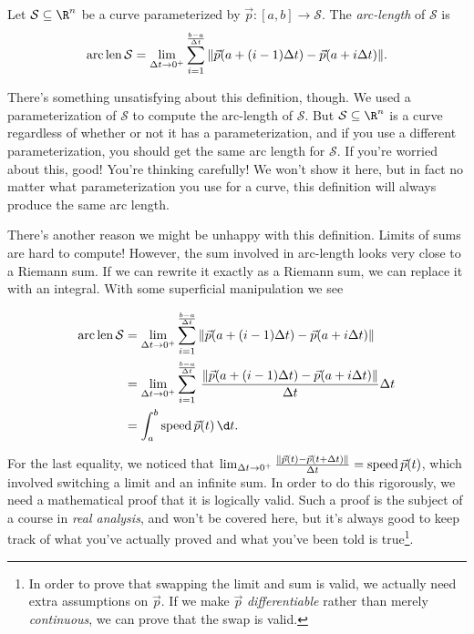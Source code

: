 \begin{definition}
	Let $\mathcal S\subseteq \R^n$ be a curve parameterized by $\vec p:[a,b]\to\mathcal S$. 
	The \emph{arc-length}
	of $\mathcal S$ is 
	\[
		\operatorname{arc\,len}\mathcal S = \lim_{\Delta t\to 0^+} \sum_{i=1}^{\frac{b-a}{\Delta t}} 
		\,\lVert\vec p(a+(i-1)\Delta t)-\vec p(a+i\Delta t)\rVert.
	\]
\end{definition}

There's something unsatisfying about this definition, though.  We used a parameterization
of $\mathcal S$ to compute the arc-length of $\mathcal S$.  But $\mathcal S\subseteq \R^n$ 
is a curve regardless of whether or not it has a parameterization, and if you use a different
parameterization, you should get the same arc length for $\mathcal S$.  If you're worried about
this, good!  You're thinking carefully!  We won't show it here, but in fact no matter what parameterization
you use for a curve, this definition will always produce the same arc length.

There's another reason we might be unhappy with this definition.  Limits of sums are
hard to compute!  However, the sum involved in arc-length looks very close to a Riemann sum.
If we can rewrite it exactly as a Riemann sum, we can replace it with an integral.  With some
superficial manipulation we see

\begin{align*}
	\Arclen\mathcal S 
	&= \lim_{\Delta t\to 0^+} \sum_{i=1}^{\frac{b-a}{\Delta t}} 
	\,\norm{\vec p(a+(i-1)\Delta t)-\vec p(a+i\Delta t)}\\
	&= \lim_{\Delta t\to 0^+} \sum_{i=1}^{\frac{b-a}{\Delta t}} 
	\,\frac{\norm{\vec p(a+(i-1)\Delta t)-\vec p(a+i\Delta t)}}{\Delta t}\Delta t\\
	&=\int_{a}^b \Speed \vec p(t)\,\d t.
\end{align*}

For the last equality, we noticed that 
$\lim_{\Delta t\to 0^+} \frac{\lVert\vec p(t)-\vec p(t+\Delta t)\rVert}{\Delta t}=\operatorname{speed} \vec p(t)$,
which involved switching a limit and an infinite sum.  In order to do this rigorously, we need
a mathematical proof that it is logically valid.  Such a proof is the subject of a course in
\emph{real analysis}, and won't be covered here, but it's always good to keep track of what
you've actually proved and what you've been told is true\footnote{ In order to prove that swapping
the limit and sum is valid, we actually need extra assumptions on $\vec p$.  If we make $\vec p$
\emph{differentiable} rather than merely \emph{continuous}, we can prove that the swap is valid.}.

